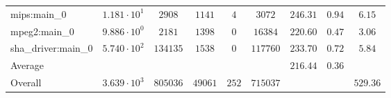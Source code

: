 \begin{tabular}{|l|c|c|c|c|c|c|c|c|}
mips:main\_0            & $ 1.181 \cdot 10^{1}  $ & $ 2908   $ & $ 1141  $ & $ 4   $ & $ 3072   $ & $ 246.31      $ & $ 0.94    $ & $ 6.15    $ \\
mpeg2:main\_0           & $ 9.886 \cdot 10^{0}  $ & $ 2181   $ & $ 1398  $ & $ 0   $ & $ 16384  $ & $ 220.60      $ & $ 0.47    $ & $ 3.06    $ \\
sha\_driver:main\_0     & $ 5.740 \cdot 10^{2}  $ & $ 134135 $ & $ 1538  $ & $ 0   $ & $ 117760 $ & $ 233.70      $ & $ 0.72    $ & $ 5.84    $ \\
\hline
Average                 & $                     $ & $        $ & $       $ & $     $ & $        $ & $ 216.44      $ & $ 0.36    $ & $         $ \\
\hline
Overall                 & $ 3.639 \cdot 10^{3}  $ & $ 805036 $ & $ 49061 $ & $ 252 $ & $ 715037 $ & $             $ & $         $ & $ 529.36  $ \\
\hline
\end{tabular}
